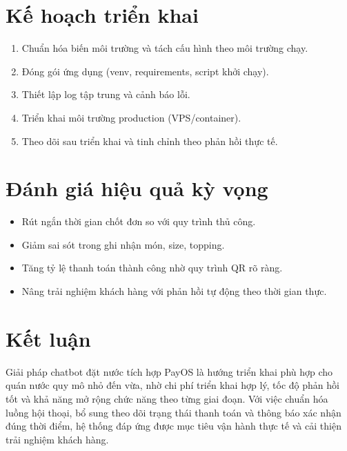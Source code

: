\documentclass[12pt,a4paper]{article}
\begin{document}
\section{Kế hoạch triển khai}
\begin{enumerate}
    \item Chuẩn hóa biến môi trường và tách cấu hình theo môi trường chạy.
    \item Đóng gói ứng dụng (venv, requirements, script khởi chạy).
    \item Thiết lập log tập trung và cảnh báo lỗi.
    \item Triển khai môi trường production (VPS/container).
    \item Theo dõi sau triển khai và tinh chỉnh theo phản hồi thực tế.
\end{enumerate}

\section{Đánh giá hiệu quả kỳ vọng}
\begin{itemize}
    \item Rút ngắn thời gian chốt đơn so với quy trình thủ công.
    \item Giảm sai sót trong ghi nhận món, size, topping.
    \item Tăng tỷ lệ thanh toán thành công nhờ quy trình QR rõ ràng.
    \item Nâng trải nghiệm khách hàng với phản hồi tự động theo thời gian thực.
\end{itemize}

\section{Kết luận}
Giải pháp chatbot đặt nước tích hợp PayOS là hướng triển khai phù hợp cho quán nước quy mô nhỏ đến vừa, nhờ chi phí triển khai hợp lý, tốc độ phản hồi tốt và khả năng mở rộng chức năng theo từng giai đoạn. Với việc chuẩn hóa luồng hội thoại, bổ sung theo dõi trạng thái thanh toán và thông báo xác nhận đúng thời điểm, hệ thống đáp ứng được mục tiêu vận hành thực tế và cải thiện trải nghiệm khách hàng.

\appendix
\end{document}
